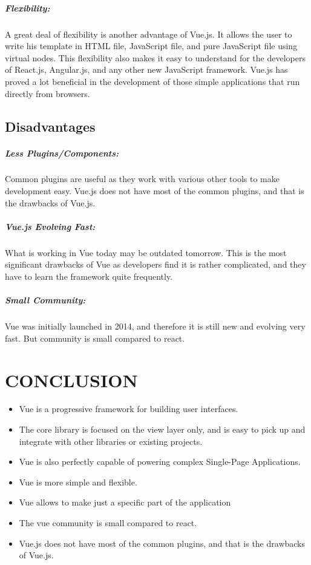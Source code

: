 \documentclass[12pt,a4paper,oneside]{report}
\begin{document}
\paragraph{Flexibility:}
A great deal of flexibility is another advantage of Vue.js. It allows
the user to write his template in HTML file, JavaScript file, and
pure JavaScript file using virtual nodes. This flexibility also makes
it easy to understand for the developers of React.js, Angular.js,
and any other new JavaScript framework. Vue.js has proved a lot
beneficial in the development of those simple applications that run
directly from browsers.
\section{Disadvantages}
\paragraph{Less Plugins/Components:}

Common plugins are useful as they work with various other tools to make development easy. Vue.js does not have most of the common plugins, and that is the drawbacks of Vue.js.

\paragraph{Vue.js Evolving Fast:}

What is working in Vue today may be outdated tomorrow. This is the most significant drawbacks of Vue as developers find it is rather complicated, and they have to learn the framework quite frequently.


\paragraph{Small Community:}

Vue was initially launched in 2014, and therefore it is still new and evolving very fast. But community is small compared to react.
\chapter{CONCLUSION}

\begin{itemize}

\item Vue is a progressive framework for building user interfaces. 
\item The core library is focused on the view layer only, and is easy to pick up and integrate with other libraries or existing projects.  
\item Vue is also perfectly capable of powering complex Single-Page  Applications.
\item Vue is more simple and flexible.
\item Vue allows to make just a specific part of the application
\item The vue community is small compared to react.
\item Vue.js does not have most of the common plugins, and that is the drawbacks of Vue.js.


\end{itemize}
\end{document}
